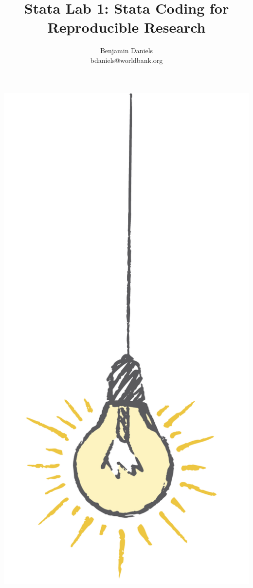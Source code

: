 \documentclass{tufte-handout}
\title{Stata Lab 1: Stata Coding for Reproducible Research}
\author{Benjamin Daniels \\ bdaniels@worldbank.org}
\begin{document}
\maketitle%

\begin{marginfigure}%
  \includegraphics[width=\linewidth]{light.png}
\end{marginfigure}
\end{document}
